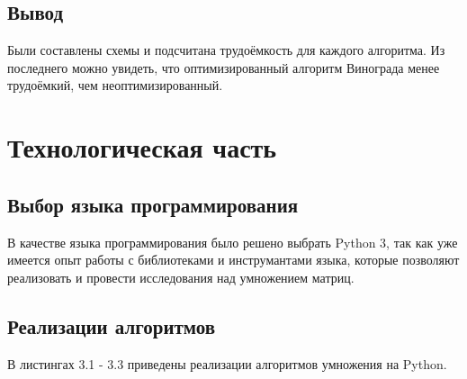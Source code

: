 \documentclass[12pt,a4paper]{report}
\begin{document}
\section{Вывод}

Были составлены схемы и подсчитана трудоёмкость для каждого алгоритма.
Из последнего можно увидеть, что оптимизированный алгоритм Винограда менее трудоёмкий, чем неоптимизированный. 

\newpage
\chapter{Технологическая часть}

\section{Выбор языка программирования}

В качестве языка программирования было решено выбрать Python 3, так как уже имеется опыт работы с 
библиотеками и инструмантами языка, которые позволяют реализовать и провести исследования над 
умножением матриц.

\section{Реализации алгоритмов}

В листингах 3.1 - 3.3 приведены реализации алгоритмов умножения на Python.
\end{document}
